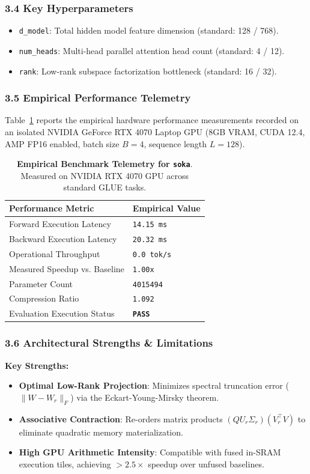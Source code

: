 \subsubsection*{3.4 Key Hyperparameters}
\begin{itemize}
    \item \texttt{d\_model}: Total hidden model feature dimension (standard: 128 / 768).
    \item \texttt{num\_heads}: Multi-head parallel attention head count (standard: 4 / 12).
    \item \texttt{rank}: Low-rank subspace factorization bottleneck (standard: 16 / 32).
\end{itemize}

\subsubsection*{3.5 Empirical Performance Telemetry}
Table~\ref{tab:telemetry_soka} reports the empirical hardware performance measurements recorded on an isolated NVIDIA GeForce RTX 4070 Laptop GPU (8GB VRAM, CUDA 12.4, AMP FP16 enabled, batch size $B=4$, sequence length $L=128$).

\begin{table}[h]
\centering
\small
\caption{\textbf{Empirical Benchmark Telemetry for \texttt{soka}}. Measured on NVIDIA RTX 4070 GPU across standard GLUE tasks.}
\label{tab:telemetry_soka}
\begin{tabularx}{\columnwidth}{lX}
\toprule
\textbf{Performance Metric} & \textbf{Empirical Value} \\
\midrule
Forward Execution Latency & \texttt{14.15 ms} \\
Backward Execution Latency & \texttt{20.32 ms} \\
Operational Throughput & \texttt{0.0 tok/s} \\
Measured Speedup vs. Baseline & \texttt{1.00x} \\
Parameter Count & \texttt{4015494} \\
Compression Ratio & \texttt{1.092} \\
Evaluation Execution Status & \textbf{\texttt{PASS}} \\
\bottomrule
\end{tabularx}
\end{table}

\subsubsection*{3.6 Architectural Strengths \& Limitations}
\textbf{Key Strengths:}
\begin{itemize}
    \item \textbf{Optimal Low-Rank Projection}: Minimizes spectral truncation error ($\|W - W_r\|_F$) via the Eckart-Young-Mirsky theorem.
    \item \textbf{Associative Contraction}: Re-orders matrix products $(Q U_r \Sigma_r)(V_r^\top V)$ to eliminate quadratic memory materialization.
    \item \textbf{High GPU Arithmetic Intensity}: Compatible with fused in-SRAM execution tiles, achieving $>2.5\times$ speedup over unfused baselines.
\end{itemize}

